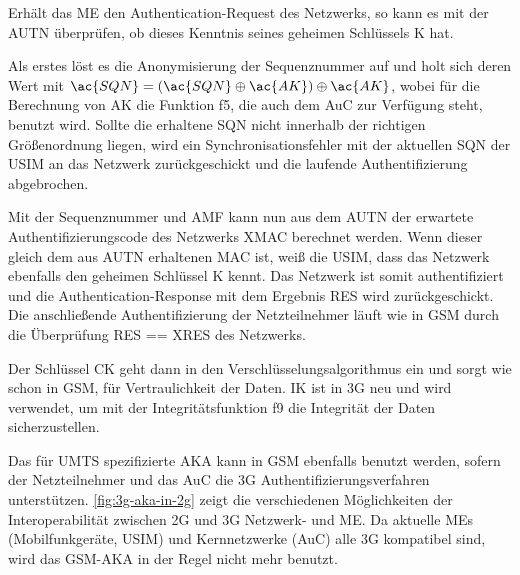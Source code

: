 Erhält das \ac{ME} den Authentication-Request des Netzwerks, so kann es mit der \ac{AUTN} überprüfen, ob dieses Kenntnis seines geheimen Schlüssels \ac{K} hat. 

Als erstes löst es die Anonymisierung der Sequenznummer auf und holt sich deren Wert mit $\ac{SQN} = (\ac{SQN} \oplus \ac{AK}) \oplus \ac{AK}$, wobei für die Berechnung von \ac{AK} die Funktion f5, die auch dem \ac{AuC} zur Verfügung steht, benutzt wird. Sollte die erhaltene \ac{SQN} nicht innerhalb der richtigen Größenordnung liegen, wird ein Synchronisationsfehler mit der aktuellen \ac{SQN} der \ac{USIM} an das Netzwerk zurückgeschickt und die laufende Authentifizierung abgebrochen.

Mit der Sequenznummer und \ac{AMF} kann nun aus dem \ac{AUTN} der erwartete Authentifizierungscode des Netzwerks \ac{XMAC} berechnet werden. Wenn dieser gleich dem aus \ac{AUTN} erhaltenen \ac{MAC} ist, weiß die \ac{USIM}, dass das Netzwerk ebenfalls den geheimen Schlüssel \ac{K} kennt. Das Netzwerk ist somit authentifiziert und die Authentication-Response mit dem Ergebnis \ac{RES} wird zurückgeschickt. Die anschließende Authentifizierung der Netzteilnehmer läuft wie in \ac{GSM} durch die Überprüfung \ac{RES} == \ac{XRES} des Netzwerks.

Der Schlüssel \ac{CK} geht dann in den Verschlüsselungsalgorithmus ein und sorgt wie schon in \ac{GSM}, für Vertraulichkeit der Daten. \ac{IK} ist in 3G neu und wird verwendet, um mit der Integritätsfunktion f9  die Integrität der Daten sicherzustellen.

Das für \ac{UMTS} spezifizierte \ac{AKA} kann in \ac{GSM} ebenfalls benutzt werden, sofern der Netzteilnehmer und das \ac{AuC} die 3G Authentifizierungsverfahren unterstützen. \autoref{fig:3g-aka-in-2g} zeigt die verschiedenen Möglichkeiten der Interoperabilität zwischen 2G und 3G Netzwerk- und \ac{ME}. Da aktuelle \acp{ME} (Mobilfunkgeräte, \ac{USIM}) und Kernnetzwerke (\ac{AuC}) alle 3G kompatibel sind, wird das \ac{GSM}-\ac{AKA} in der Regel nicht mehr benutzt.

